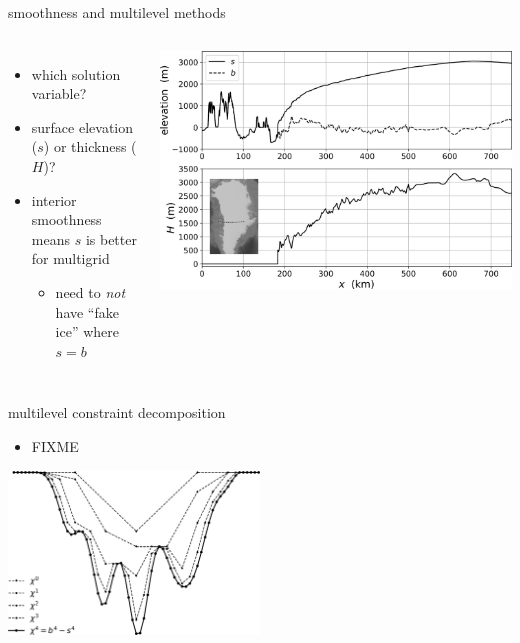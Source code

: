 \documentclass[usepdftitle=false]{beamer}
\begin{document}
\begin{frame}{smoothness and multilevel methods}

\begin{columns}
    \begin{itemize}
    \small
    \item which solution variable?
    \item surface elevation ($s$) or thickness ($H$)?
    \item interior smoothness means $s$ is better for multigrid
        \begin{itemize}
        \item need to \emph{not} have ``fake ice'' where $s=b$
        \end{itemize}
    \end{itemize}
    \includegraphics[width=\textwidth]{figs/giscross.png}
\end{columns}
\end{frame}


\begin{frame}{multilevel constraint decomposition}

\begin{itemize}
\item FIXME
\end{itemize}

\includegraphics[width=0.5\textwidth]{figs/decompclassical.png}


\end{frame}
\end{document}
